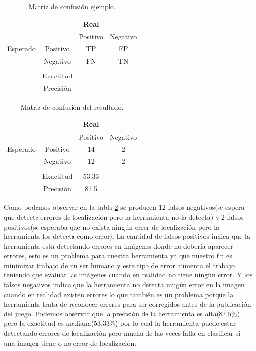 \begin{table}[H]
	\centering
	\begin{tabular}{|c|c|c|c|}
		\hline
		& & Real &   \\
		\hline
		&          & Positivo & Negativo                   \\
		\hline
		Esperado & Positivo & TP& FP \\
		\hline
		& Negativo & 		  FN& TN                \\
		\hline
				&&&\\
		\hline
		&Exactitud&  & \\
		\hline
		&Precisión&  &\\
		\hline
	\end{tabular}
	\caption{Matriz de confusión ejemplo.}
	\label{table:mt_ej}
\end{table}
\begin{table}[H]
	\centering
	\begin{tabular}{|c|c|c|c|}
		\hline
		& & Real &   \\
		\hline
		&          & Positivo & Negativo                   \\
		\hline
		Esperado & Positivo & 14& 2 \\
		\hline
		& Negativo & 		  12& 2                 \\
 		\hline
 						&&&\\
 		\hline
 		&Exactitud& 53.33 & \\
 		\hline
 		&Precisión& 87.5 &\\
 		\hline
	\end{tabular}
	\caption{Matriz de confusión del resultado.}
	\label{table:mt_ori}
\end{table}

Como podemos observar en la tabla \ref{table:mt_ori} se producen 12 falsos negativos(se espera que detecte errores de localización pero la herramienta no lo detecta) y 2 falsos positivos(se esperaba que no exista ningún error de localización pero la herramienta los detecta como error). La cantidad de falsos positivos indica que la herramienta está detectando errores en imágenes donde no debería aparecer errores, esto es un problema para nuestra herramienta ya que nuestro fin es minimizar trabajo de un ser humano y este tipo de error aumenta el trabajo teniendo que evaluar las imágenes cuando en realidad no tiene ningún error. Y los falsos negativos indica que la herramienta no detecta ningún error en la imagen cuando en realidad existen errores lo que también es un problema porque la herramienta trata de reconocer errores para ser corregidos antes de la publicación del juego. Podemos observar que la precisión de la herramienta es alta(87.5\%) pero la exactitud es mediana(53.33\%) por lo cual la herramienta puede estar detectando errores de localización pero mucha de las veces falla en clasificar si una imagen tiene o no error de localización.


